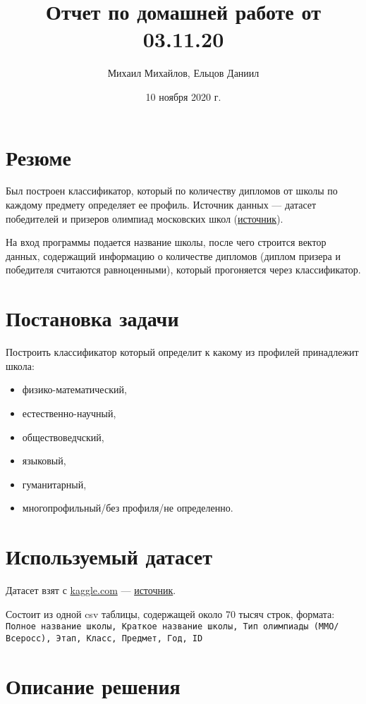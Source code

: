 \documentclass{article}
\title{Отчет по домашней работе от 03.11.20}
\author{Михаил Михайлов, Ельцов Даниил}
\date{10 ноября 2020 г.}
\begin{document}
\maketitle
\tableofcontents

\section*{Резюме}
Был построен классификатор, который по количеству дипломов от школы по каждому предмету определяет ее профиль. Источник данных --- датасет победителей и призеров олимпиад московских школ (\href{https://www.kaggle.com/romazepa/moscow-schools-winners-of-educational-olympiads}{источник}). 

На вход программы подается название школы, после чего строится вектор данных, содержащий информацию о количестве дипломов (диплом призера и победителя считаются равноценными), который прогоняется через классификатор. 

\newpage
\section{Постановка задачи}
Построить классификатор который определит к какому из профилей принадлежит школа:
\begin{itemize}
    \item физико-математический,
    \item естественно-научный,
    \item обществоведчский,
    \item языковый,
    \item гуманитарный,
    \item многопрофильный/без профиля/не определенно.
\end{itemize}
\section{Используемый датасет}
Датасет взят с \url{kaggle.com} --- \href{https://www.kaggle.com/romazepa/moscow-schools-winners-of-educational-olympiads}{источник}.

Состоит из одной csv таблицы, содержащей около 70 тысяч строк, формата: \\
\small{\texttt{Полное название школы, Краткое название школы, Тип олимпиады (ММО/Всеросс), Этап, Класс, Предмет, Год, ID}}

\section{Описание решения}
\end{document}
